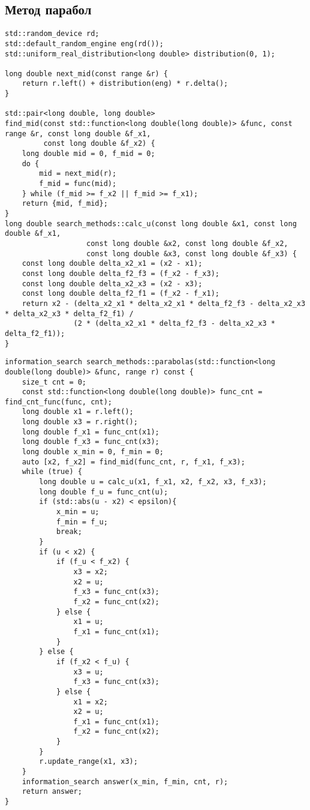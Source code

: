 \subsection{Метод парабол} 
\begin{lstlisting}
std::random_device rd;
std::default_random_engine eng(rd());
std::uniform_real_distribution<long double> distribution(0, 1);

long double next_mid(const range &r) {
    return r.left() + distribution(eng) * r.delta();
}

std::pair<long double, long double>
find_mid(const std::function<long double(long double)> &func, const range &r, const long double &f_x1,
         const long double &f_x2) {
    long double mid = 0, f_mid = 0;
    do {
        mid = next_mid(r);
        f_mid = func(mid);
    } while (f_mid >= f_x2 || f_mid >= f_x1);
    return {mid, f_mid};
}
long double search_methods::calc_u(const long double &x1, const long double &f_x1,
                   const long double &x2, const long double &f_x2,
                   const long double &x3, const long double &f_x3) {
    const long double delta_x2_x1 = (x2 - x1);
    const long double delta_f2_f3 = (f_x2 - f_x3);
    const long double delta_x2_x3 = (x2 - x3);
    const long double delta_f2_f1 = (f_x2 - f_x1);
    return x2 - (delta_x2_x1 * delta_x2_x1 * delta_f2_f3 - delta_x2_x3 * delta_x2_x3 * delta_f2_f1) /
                (2 * (delta_x2_x1 * delta_f2_f3 - delta_x2_x3 * delta_f2_f1));
}
\end{lstlisting}
\newpage
\begin{lstlisting}
information_search search_methods::parabolas(std::function<long double(long double)> &func, range r) const {
    size_t cnt = 0;
    const std::function<long double(long double)> func_cnt = find_cnt_func(func, cnt);
    long double x1 = r.left();
    long double x3 = r.right();
    long double f_x1 = func_cnt(x1);
    long double f_x3 = func_cnt(x3);
    long double x_min = 0, f_min = 0;
    auto [x2, f_x2] = find_mid(func_cnt, r, f_x1, f_x3);
    while (true) {
        long double u = calc_u(x1, f_x1, x2, f_x2, x3, f_x3);
        long double f_u = func_cnt(u);
        if (std::abs(u - x2) < epsilon){
            x_min = u;
            f_min = f_u;
            break;
        }
        if (u < x2) {
            if (f_u < f_x2) {
                x3 = x2;
                x2 = u;
                f_x3 = func_cnt(x3);
                f_x2 = func_cnt(x2);
            } else {
                x1 = u;
                f_x1 = func_cnt(x1);
            }
        } else {
            if (f_x2 < f_u) {
                x3 = u;
                f_x3 = func_cnt(x3);
            } else {
                x1 = x2;
                x2 = u;
                f_x1 = func_cnt(x1);
                f_x2 = func_cnt(x2);
            }
        }
        r.update_range(x1, x3);
    }
    information_search answer(x_min, f_min, cnt, r);
    return answer;
}
\end{lstlisting}

